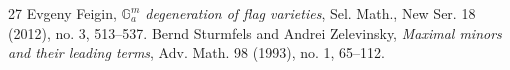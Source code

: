 \documentclass[10pt]{amsart}
\theoremstyle{definition}
\begin{document}
\begin{thebibliography}{27}
 Evgeny Feigin, \emph{$\mathbb{G}_a^m$ degeneration of flag varieties}, Sel. Math., New Ser. 18 (2012), no. 3, 513--537.
 Bernd Sturmfels and Andrei Zelevinsky, \emph{Maximal minors and their leading terms}, Adv. Math. 98 (1993), no. 1, 65--112.
\end{thebibliography}
\end{document}
